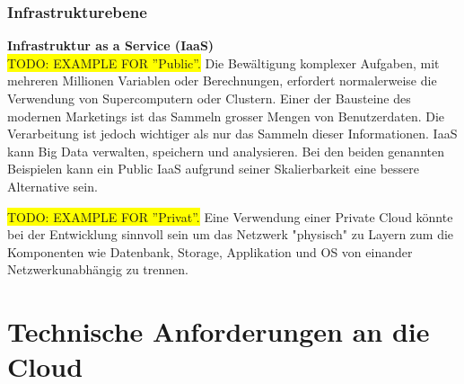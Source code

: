 \documentclass[11pt,titlepage]{article}
\begin{document}
\subsubsection{Infrastrukturebene}
\label{subsec:Aufgabe-3_Infrastrukturebene}
{\large\bf Infrastruktur as a Service (IaaS)} \\\medskip
\colorbox{yellow}{TODO: EXAMPLE FOR ''Public''.}
Die Bewältigung komplexer Aufgaben, mit mehreren Millionen Variablen oder Berechnungen, erfordert normalerweise die Verwendung von Supercomputern oder Clustern. 
Einer der Bausteine des modernen Marketings ist das Sammeln grosser Mengen von Benutzerdaten. Die Verarbeitung ist jedoch wichtiger als nur das Sammeln dieser Informationen. IaaS kann Big Data verwalten, speichern und analysieren. Bei den beiden genannten Beispielen kann ein Public IaaS aufgrund seiner Skalierbarkeit eine bessere Alternative sein.
\par\medskip
\colorbox{yellow}{TODO: EXAMPLE FOR ''Privat''.}
Eine Verwendung einer Private Cloud könnte bei der Entwicklung sinnvoll sein um das Netzwerk "physisch" zu Layern zum die Komponenten wie Datenbank, Storage, Applikation und OS von einander Netzwerkunabhängig zu trennen.

\section{Technische Anforderungen an die Cloud}
\end{document}

